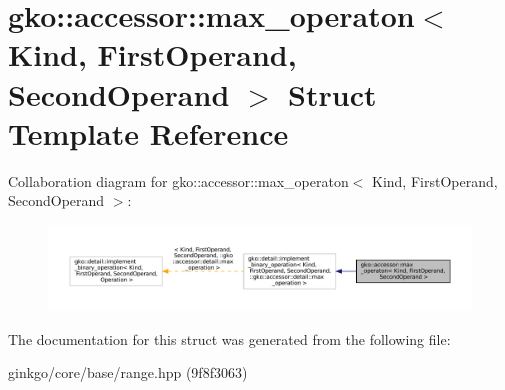 \hypertarget{structgko_1_1accessor_1_1max__operaton}{}\section{gko\+:\+:accessor\+:\+:max\+\_\+operaton$<$ Kind, First\+Operand, Second\+Operand $>$ Struct Template Reference}
\label{structgko_1_1accessor_1_1max__operaton}


Collaboration diagram for gko\+:\+:accessor\+:\+:max\+\_\+operaton$<$ Kind, First\+Operand, Second\+Operand $>$\+:
\nopagebreak
\begin{figure}[H]
\begin{center}
\leavevmode
\includegraphics[width=350pt]{structgko_1_1accessor_1_1max__operaton__coll__graph}
\end{center}
\end{figure}


The documentation for this struct was generated from the following file\+:\begin{DoxyCompactItemize}
\item 
ginkgo/core/base/range.\+hpp (9f8f3063)\end{DoxyCompactItemize}
